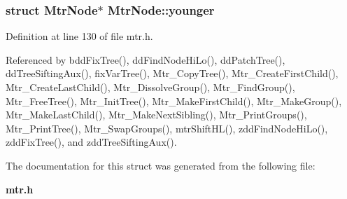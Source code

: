 \subsubsection{\setlength{\rightskip}{0pt plus 5cm}struct \bf{Mtr\-Node}$\ast$ \bf{Mtr\-Node::younger}}\label{structMtrNode_954fd8014884285b38a15a4623e77217}




Definition at line 130 of file mtr.h.

Referenced by bdd\-Fix\-Tree(), dd\-Find\-Node\-Hi\-Lo(), dd\-Patch\-Tree(), dd\-Tree\-Sifting\-Aux(), fix\-Var\-Tree(), Mtr\_\-Copy\-Tree(), Mtr\_\-Create\-First\-Child(), Mtr\_\-Create\-Last\-Child(), Mtr\_\-Dissolve\-Group(), Mtr\_\-Find\-Group(), Mtr\_\-Free\-Tree(), Mtr\_\-Init\-Tree(), Mtr\_\-Make\-First\-Child(), Mtr\_\-Make\-Group(), Mtr\_\-Make\-Last\-Child(), Mtr\_\-Make\-Next\-Sibling(), Mtr\_\-Print\-Groups(), Mtr\_\-Print\-Tree(), Mtr\_\-Swap\-Groups(), mtr\-Shift\-HL(), zdd\-Find\-Node\-Hi\-Lo(), zdd\-Fix\-Tree(), and zdd\-Tree\-Sifting\-Aux().

The documentation for this struct was generated from the following file:\begin{CompactItemize}
\item 
\bf{mtr.h}\end{CompactItemize}
